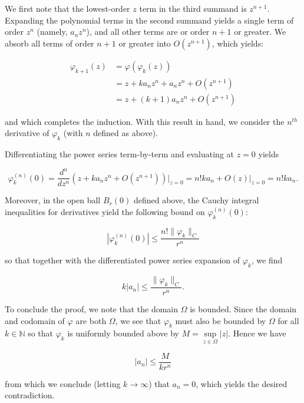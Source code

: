 \begin{solution}
    We first note that the lowest-order $z$ term in the third summand is $z^{n+1}$. Expanding the polynomial terms in
    the second summand yields a single term of order $z^n$ (namely, $a_n z^n$), and all other terms are or order $n+1$
    or greater. We absorb all terms of order $n+1$ or greater into $O(z^{n+1})$, which yields:

    \begin{align*}
        \varphi_{k+1}(z) &= \varphi(\varphi_k(z)) \\
                         &= z + k a_n z^n + a_n z^n + O\left(z^{n+1}\right) \\
                         &= z + (k+1) a_n z^n + O\left(z^{n+1}\right)
    \end{align*}

    and which completes the induction. With this result in hand, we consider the $n^{th}$ derivative of $\varphi_k$ 
    (with $n$ defined as above). 
    
    Differentiating the power series term-by-term and evaluating at $z = 0$ yields

    $$
    \varphi_k^{(n)}(0) = \frac{d^n}{dz^n}\left(z + k a_n z^n + O\left(z^{n+1}\right)\right) \vert_{z=0} = n! k a_n + O\left(z\right) \vert_{z=0} = n! k a_n.
    $$

    Moreover, in the open ball $B_r(0)$ defined above, the Cauchy integral inequalities for derivatives yield the
    following bound on $\varphi_k^{(n)}(0)$:

    $$
    \left|\varphi_k^{(n)}(0)\right| \le \frac{n! \lVert \varphi_k \rVert_C}{r^n}
    $$

    so that together with the differentiated power series expansion of $\varphi_k$, we find

    $$
    k |a_n| \le \frac{\lVert \varphi_k \rVert_C}{r^n}.
    $$

    To conclude the proof, we note that the domain $\Omega$ is bounded. Since the domain and codomain of $\varphi$ are
    both $\Omega$, we see that $\varphi_k$ must also be bounded by $\Omega$ for all $k \in \mathbb{N}$ so that 
    $\varphi_k$ is uniformly bounded above by $M = \sup\limits_{z \in \Omega} |z|$. Hence we have

    $$
    |a_n| \le \frac{M}{k r^n}
    $$

    from which we conclude (letting $k \to \infty$) that $a_n = 0$, which yields the desired contradiction.


\end{solution}
